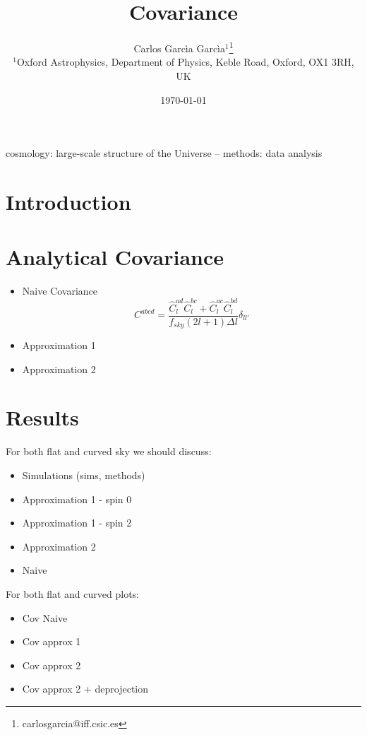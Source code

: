 \documentclass[useAMS,usenatbib]{mn2e}
\title[Covariance]{Covariance}
\author[Carlos Garc\`{i}a Garc\`{i}a]{Carlos Garc\`{i}a Garc\`{i}a$^1$\thanks{carlosgarcia@iff.csic.es}\\
$^{1}$Oxford Astrophysics, Department of Physics, Keble Road, Oxford, OX1 3RH, UK
}
\newcommand{\pcl}[3]{\hat C_{#1}^{#2 #3}}
\begin{document}
  \date{\today}
   
  \maketitle

\begin{abstract}
\end{abstract}

\begin{keywords}
  cosmology: large-scale structure of the Universe -- methods: data analysis
\end{keywords}

\section{Introduction}
    
\section{Analytical Covariance}
\begin{itemize}
\item Naive Covariance
  \begin{equation}
    C^{abcd} = \frac{\pcl{l}ad \pcl{l}bc + \pcl{l}ac \pcl{l}bd}{f_{sky} (2l +
      1) \Delta l} \delta_{ll'}
  \end{equation}
\item Approximation 1
\item Approximation 2
\end{itemize}

\section{Results}
For both flat and curved sky we should discuss:
\begin{itemize}
\item Simulations (sims, methods)
\item Approximation 1 - spin 0
\item Approximation 1 - spin 2
\item Approximation 2
\item Naive
\end{itemize}

For both flat and curved plots:
\begin{itemize}
\item Cov Naive
\item Cov approx 1
\item Cov approx 2
\item Cov approx 2 + deprojection
\end{itemize}
\end{document}
